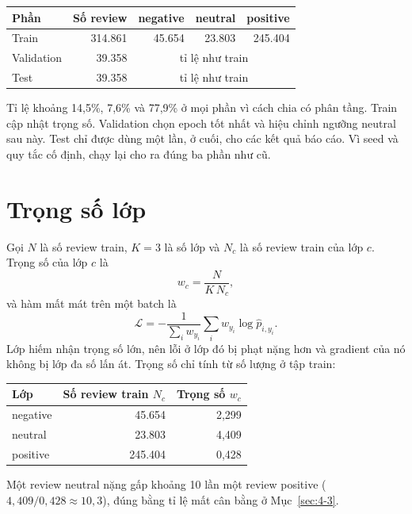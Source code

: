 \begin{center}
\begin{tabular}{@{}lrrrr@{}}
    \toprule
    Phần & Số review & negative & neutral & positive \\
    \midrule
    Train & 314.861 & 45.654 & 23.803 & 245.404 \\
    Validation & 39.358 & \multicolumn{3}{c}{tỉ lệ như train} \\
    Test & 39.358 & \multicolumn{3}{c}{tỉ lệ như train} \\
    \bottomrule
\end{tabular}
\end{center}

Tỉ lệ khoảng 14,5\%, 7,6\% và 77,9\% ở mọi phần vì cách chia có phân tầng. Train cập nhật trọng số. Validation chọn epoch tốt nhất và hiệu chỉnh ngưỡng neutral sau này. Test chỉ được dùng một lần, ở cuối, cho các kết quả báo cáo. Vì seed và quy tắc cố định, chạy lại cho ra đúng ba phần như cũ.

\section{Trọng số lớp}
\label{sec:5-7}

Gọi $N$ là số review train, $K=3$ là số lớp và $N_c$ là số review train của lớp $c$. Trọng số của lớp $c$ là
\begin{equation*}
    w_c = \frac{N}{K\,N_c},
\end{equation*}
và hàm mất mát trên một batch là
\begin{equation*}
    \mathcal{L} = -\frac{1}{\sum_i w_{y_i}} \sum_i w_{y_i}\log \hat p_{i,y_i}.
\end{equation*}
Lớp hiếm nhận trọng số lớn, nên lỗi ở lớp đó bị phạt nặng hơn và gradient của nó không bị lớp đa số lấn át. Trọng số chỉ tính từ số lượng ở tập train:

\begin{center}
\begin{tabular}{@{}lrr@{}}
    \toprule
    Lớp & Số review train $N_c$ & Trọng số $w_c$ \\
    \midrule
    negative & 45.654 & 2,299 \\
    neutral & 23.803 & 4,409 \\
    positive & 245.404 & 0,428 \\
    \bottomrule
\end{tabular}
\end{center}

Một review neutral nặng gấp khoảng 10 lần một review positive ($4{,}409/0{,}428 \approx 10{,}3$), đúng bằng tỉ lệ mất cân bằng ở Mục~\ref{sec:4-3}.

